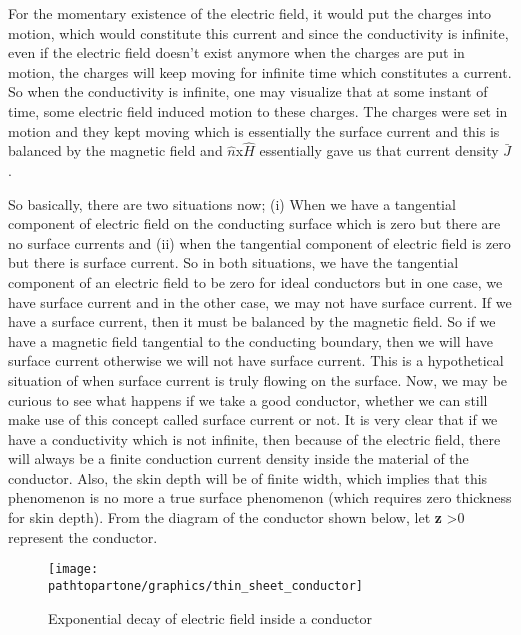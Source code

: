 For the momentary existence of the electric field, it would put the charges into motion, which would constitute this current and since the conductivity is infinite, even if the electric field doesn't exist anymore when the charges are put in motion, the charges will keep moving for infinite time which constitutes a current. So when the conductivity is infinite, one may visualize that at some instant of time, some electric field induced motion to these charges. The charges were set in motion and they kept moving which is essentially the surface current and this is balanced by the magnetic field and $\hat{n}$x$\hat{H}$ essentially gave us that current density $\bar{J}$.

So basically, there are two situations now; (i) When we have a tangential component of electric field on the conducting surface which is zero but there are no surface currents and (ii) when the tangential component of electric field is zero but there is surface current. So in both situations, we have the tangential component of an electric field to be zero for ideal conductors but in one case, we have surface current and in the other case, we may not have surface current. If we have a surface current, then it must be balanced by the magnetic field. So if we have a magnetic field tangential to the conducting boundary, then we will have surface current otherwise we will not have surface current. This is a hypothetical situation of when surface current is truly flowing on the surface. Now, we may be curious to see what happens if we take a good conductor, whether we can still make use of this concept called surface current or not. It is very clear that if we have a conductivity which is not infinite, then because of the electric field, there will always be a finite conduction current density inside the material of the conductor. Also, the skin depth will be of finite width, which implies that this phenomenon is no more a true surface phenomenon (which requires zero thickness for skin depth). From the diagram of the conductor shown below, let \textbf{z} \textgreater 0 represent the conductor.
\begin{figure}[h]
\centering
\texttt{[image: \\pathtopartone/graphics/thin\_sheet\_conductor]}
\caption{Exponential decay of electric field inside a conductor}
\label{fig:exponential_decay_of_E_in_conductor}
\end{figure}	


